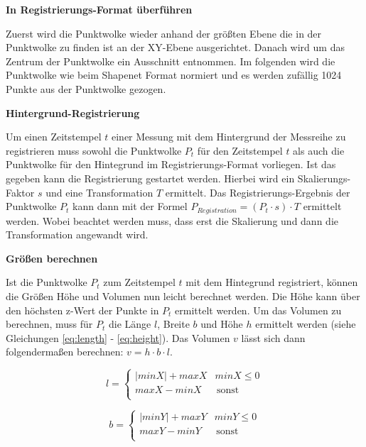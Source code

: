 \documentclass[12pt,titlepage, twoside]{article}
\begin{document}
\textbf{In Registrierungs-Format überführen}

Zuerst wird die Punktwolke wieder anhand der größten Ebene die in der Punktwolke zu finden ist an der XY-Ebene ausgerichtet.
Danach wird um das Zentrum der Punktwolke ein Ausschnitt entnommen. 
Im folgenden wird die Punktwolke wie beim Shapenet Format normiert und es werden zufällig 1024 Punkte aus der Punktwolke gezogen.

\textbf{Hintergrund-Registrierung}

Um einen Zeitstempel $t$ einer Messung mit dem Hintergrund der Messreihe zu registrieren muss sowohl die Punktwolke $P_t$ für den Zeitstempel $t$ als auch die Punktwolke für den Hintegrund im Registrierungs-Format vorliegen.
Ist das gegeben kann die Registrierung gestartet werden. Hierbei wird ein Skalierungs-Faktor $s$ und eine Transformation $T$ ermittelt. 
Das Registrierungs-Ergebnis der Punktwolke $P_t$ kann dann mit der Formel $P_{Registration} = (P_t \cdot s) \cdot T$ ermittelt werden. Wobei beachtet werden muss, dass erst die Skalierung und dann die Transformation angewandt wird.

\textbf{Größen berechnen}

Ist die Punktwolke $P_t$ zum Zeitstempel $t$ mit dem Hintegrund registriert, können die Größen Höhe und Volumen nun leicht berechnet werden.
Die Höhe kann über den höchsten z-Wert der Punkte in $P_t$ ermittelt werden. Um das Volumen zu berechnen, muss für $P_t$ die Länge $l$, Breite $b$ und Höhe $h$ ermittelt werden (siehe Gleichungen \ref{eq:length} - \ref{eq:height}). 
Das Volumen $v$ lässt sich dann folgendermaßen berechnen: $v = h \cdot b \cdot l$.

\begin{equation}
    \label{eq:length}
    l = \left\{
    \begin{array}{ll}
    |minX| + maxX & minX \leq 0 \\
    maxX - minX & \, \textrm{sonst} \\
    \end{array}
    \right. 
\end{equation}

\begin{equation}
    \label{eq:width}
    b = \left\{
    \begin{array}{ll}
    |minY| + maxY & minY \leq 0 \\
    maxY - minY & \, \textrm{sonst} \\
    \end{array}
    \right. 
\end{equation}
\end{document}
